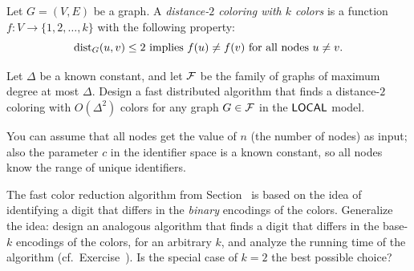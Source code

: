 \begin{ex}\label{ex:distance2col}
    Let $G = (V,E)$ be a graph. A \emph{distance-$2$ coloring with $k$ colors} is a function $f \colon V \to \{1,2,\dotsc,k\}$ with the following property:
    \[
        \operatorname{dist}_G(u,v) \le 2 \text{ implies } f(u) \ne f(v) \text{ for all nodes } u \ne v.
    \]

    Let $\Delta$ be a known constant, and let $\mathcal{F}$ be the family of graphs of maximum degree at most $\Delta$. Design a fast distributed algorithm that finds a distance-$2$ coloring with $O(\Delta^2)$ colors for any graph $G \in \mathcal{F}$ in the $\textup{\sffamily LOCAL}$ model.

    You can assume that all nodes get the value of $n$ (the number of nodes) as input; also the parameter $c$ in the identifier space is a known constant, so all nodes know the range of unique identifiers.

\end{ex}

\begin{exs}\label{ex:dpbit-base}
    The fast color reduction algorithm from Section~ is based on the idea of identifying a digit that differs in the \emph{binary} encodings of the colors. Generalize the idea: design an analogous algorithm that finds a digit that differs in the base-$k$ encodings of the colors, for an arbitrary $k$, and analyze the running time of the algorithm (cf.\ Exercise~). Is the special case of $k = 2$ the best possible choice?
\end{exs}

